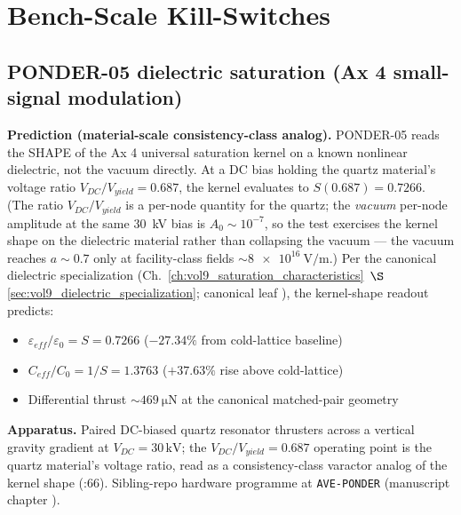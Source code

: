 \section{Bench-Scale Kill-Switches}
\label{sec:vol9_bench_kill_switches}

\subsection{PONDER-05 dielectric saturation (Ax 4 small-signal modulation)}
\label{subsec:vol9_ponder_05_falsifier}

\textbf{Prediction (material-scale consistency-class analog).} PONDER-05 reads the SHAPE of the Ax 4 universal saturation kernel on a known nonlinear dielectric, not the vacuum directly. At a DC bias holding the quartz material's voltage ratio $V_{DC}/V_{yield} = 0.687$, the kernel evaluates to $S(0.687) = 0.7266$. (The ratio $V_{DC}/V_{yield}$ is a per-node quantity for the quartz; the \emph{vacuum} per-node amplitude at the same 30~kV bias is $A_0 \sim 10^{-7}$, so the test exercises the kernel shape on the dielectric material rather than collapsing the vacuum --- the vacuum reaches $a \sim 0.7$ only at facility-class fields $\sim\qty{8e16}{\volt\per\metre}$.) Per the canonical dielectric specialization (Ch.~\ref{ch:vol9_saturation_characteristics}~$\S$\ref{sec:vol9_dielectric_specialization}; canonical leaf ), the kernel-shape readout predicts:

\begin{itemize}
    \item $\varepsilon_{eff}/\varepsilon_0 = S = 0.7266$ ($-27.34\%$ from cold-lattice baseline)
    \item $C_{eff}/C_0 = 1/S = 1.3763$ ($+37.63\%$ rise above cold-lattice)
    \item Differential thrust $\sim \qty{469}{\micro\newton}$ at the canonical matched-pair geometry
\end{itemize}

\textbf{Apparatus.} Paired DC-biased quartz resonator thrusters across a vertical gravity gradient at $V_{DC} = 30\,\text{kV}$; the $V_{DC}/V_{yield} = 0.687$ operating point is the quartz material's voltage ratio, read as a consistency-class varactor analog of the kernel shape (:66). Sibling-repo hardware programme at \texttt{AVE-PONDER} (manuscript chapter ).

